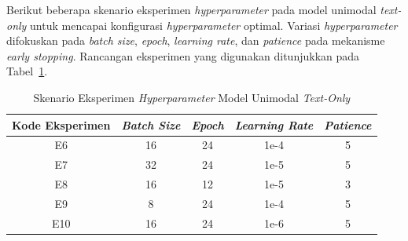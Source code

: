 Berikut beberapa skenario eksperimen \textit{hyperparameter} pada model unimodal \textit{ text-only} untuk mencapai konfigurasi \textit{hyperparameter} optimal. Variasi \textit{hyperparameter} difokuskan pada \textit{batch size}, \textit{epoch}, \textit{learning rate}, dan \textit{patience} pada mekanisme \textit{early stopping}. Rancangan eksperimen yang digunakan ditunjukkan pada Tabel~\ref{tabel:skenario_hyperparameter_unimodal_text_only}.

\begin{table}[H]
    \centering
    \caption{Skenario Eksperimen \textit{Hyperparameter} Model Unimodal \textit{ Text-Only}}
    \label{tabel:skenario_hyperparameter_unimodal_text_only}
    \small
    \setlength{\tabcolsep}{8pt}
    \renewcommand{\arraystretch}{1.1}
    \begin{tabular}{c c c c c}
        \hline
        \textbf{Kode Eksperimen} & \textbf{\textit{Batch Size}} & \textbf{\textit{Epoch}} & \textbf{\textit{Learning Rate}} & \textbf{\textit{Patience}} \\
        \hline
        E6 & 16 & 24 & 1e-4 & 5 \\
        E7 & 32 & 24 & 1e-5 & 5 \\
        E8 & 16 & 12 & 1e-5 & 3 \\
        E9 & 8 & 24 & 1e-4 & 5 \\
        E10 & 16 & 24 & 1e-6 & 5 \\
        \hline
    \end{tabular}
\end{table}




